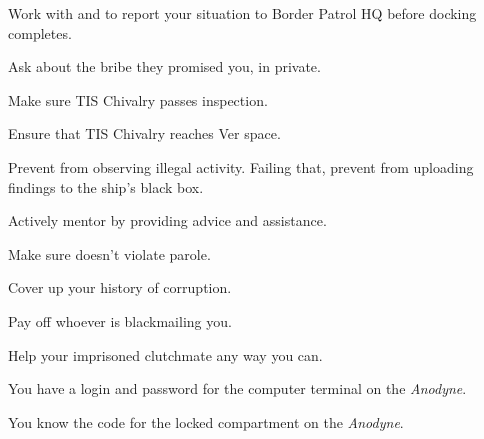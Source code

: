 \documentclass[char]{guildcamp4}
\begin{document}
\begin{itemz}[Goals]
	\item Work with \cCgood{} and \cPilot{} to report your situation to Border Patrol HQ before docking completes.
	\item Ask \cVone{} about the bribe they promised you, in private.
	\item Make sure TIS Chivalry passes inspection.
	\item Ensure that TIS Chivalry reaches Ver space.
	\item Prevent \cCgood{} from observing illegal activity. Failing that, prevent \cCgood{\them} from uploading \cCgood{\their} findings to the ship's black box.
	\item Actively mentor \cCgood{} by providing advice and assistance.
	\item Make sure \cPilot{} doesn't violate  parole. 
	\item Cover up your history of corruption.
	\item Pay off whoever is blackmailing you.
	\item Help your imprisoned clutchmate any way you can.
\end{itemz}

\begin{itemz}[Notes]
	\item You have a login and password for the computer terminal on the \emph{Anodyne}.
	\item You know the code for the locked compartment on the \emph{Anodyne}.
\end{itemz}

\begin{contacts}
	\contact{\cCgood{}}
	\contact{\cPilot{}}
	\contact{\cVone{}}
\end{contacts}
\end{document}
